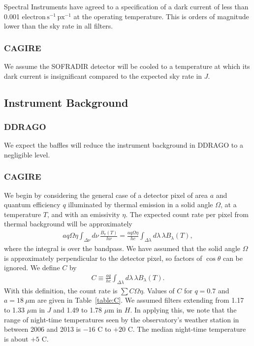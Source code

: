 \documentclass{article}
\newcommand{\micron}{\mbox{$\mu$m}}
\begin{document}
Spectral Instruments have agreed to a specification of a dark current of less than 0.001 $\mathrm{electron\,s^{-1}\,px^{-1}}$ at the operating temperature. This is orders of magnitude lower than the sky rate in all filters.

\subsubsection{CAGIRE}

We assume the SOFRADIR detector will be cooled to a temperature at which its dark current is insignificant compared to the expected sky rate in $J$.

\subsection{Instrument Background}

\subsubsection{DDRAGO}

We expect the baffles will reduce the instrument background in DDRAGO to a negligible level.

\subsubsection{CAGIRE}

We begin by considering the general case of a detector pixel of area $a$ and quantum efficiency $q$ illuminated by thermal emission in a solid angle $\Omega$, at a temperature $T$, and with an emissivity $\eta$. The expected count rate per pixel from thermal background will be approximately
\begin{eqnarray}
a q \Omega\eta \int_{\Delta\nu} d\nu\, \frac{B_\nu(T)}{h\nu}
=
\frac{a q \Omega\eta}{hc}\int_{\Delta\lambda}d\lambda\, \lambda B_\lambda(T),
\end{eqnarray}
where the integral is over the bandpass. We have assumed that the solid angle $\Omega$ is approximately perpendicular to the detector pixel, so factors of $\cos \theta$ can be ignored. We define $C$ by
\begin{eqnarray}
C \equiv \frac{a q}{hc}\int_{\Delta\lambda}d\lambda\, \lambda B_\lambda(T).
\end{eqnarray}
With this definition, the count rate is $\sum C\Omega\eta$. Values of $C$ for $q = 0.7$ and $a = 18~\micron$ are given in Table~\ref{table:C}. We assumed filters extending from 1.17 to 1.33 {\micron} in $J$ and 1.49 to 1.78 {\micron} in $H$. In applying this, we note that the range of night-time temperatures seen by the observatory’s weather station in between 2006 and 2013 is $-16$ C to $+20$ C. The median night-time temperature is about $+5$ C.
\end{document}
